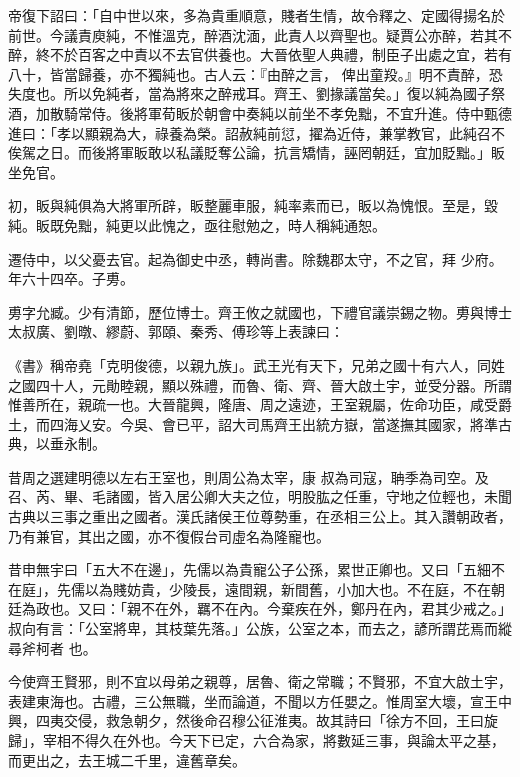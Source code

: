 \begin{pinyinscope}
 帝復下詔曰：「自中世以來，多為貴重順意，賤者生情，故令釋之、定國得揚名於前世。今議責庾純，不惟溫克，醉酒沈湎，此責人以齊聖也。疑賈公亦醉，若其不醉，終不於百客之中責以不去官供養也。大晉依聖人典禮，制臣子出處之宜，若有八十，皆當歸養，亦不獨純也。古人云：『由醉之言，
 俾出童羖。』明不責醉，恐失度也。所以免純者，當為將來之醉戒耳。齊王、劉掾議當矣。」復以純為國子祭酒，加散騎常侍。後將軍荀眅於朝會中奏純以前坐不孝免黜，不宜升進。侍中甄德進曰：「孝以顯親為大，祿養為榮。詔赦純前愆，擢為近侍，兼掌教官，此純召不俟駕之日。而後將軍眅敢以私議貶奪公論，抗言矯情，誣罔朝廷，宜加貶黜。」眅坐免官。



 初，眅與純俱為大將軍所辟，眅整麗車服，純率素而已，眅以為愧恨。至是，毀純。眅既免黜，純更以此愧之，亟往慰勉之，時人稱純通恕。



 遷侍中，以父憂去官。起為御史中丞，轉尚書。除魏郡太守，不之官，拜
 少府。年六十四卒。子旉。



 旉字允臧。少有清節，歷位博士。齊王攸之就國也，下禮官議崇錫之物。旉與博士太叔廣、劉暾、繆蔚、郭頤、秦秀、傅珍等上表諫曰：



 《書》稱帝堯「克明俊德，以親九族」。武王光有天下，兄弟之國十有六人，同姓之國四十人，元勛睦親，顯以殊禮，而魯、衛、齊、晉大啟土宇，並受分器。所謂惟善所在，親疏一也。大晉龍興，隆唐、周之遠迹，王室親屬，佐命功臣，咸受爵土，而四海乂安。今吳、會已平，詔大司馬齊王出統方嶽，當遂撫其國家，將準古典，以垂永制。



 昔周之選建明德以左右王室也，則周公為太宰，康
 叔為司寇，聃季為司空。及召、芮、畢、毛諸國，皆入居公卿大夫之位，明股肱之任重，守地之位輕也，未聞古典以三事之重出之國者。漢氏諸侯王位尊勢重，在丞相三公上。其入讚朝政者，乃有兼官，其出之國，亦不復假台司虛名為隆寵也。



 昔申無宇曰「五大不在邊」，先儒以為貴寵公子公孫，累世正卿也。又曰「五細不在庭」，先儒以為賤妨貴，少陵長，遠間親，新間舊，小加大也。不在庭，不在朝廷為政也。又曰：「親不在外，羈不在內。今棄疾在外，鄭丹在內，君其少戒之。」叔向有言：「公室將卑，其枝葉先落。」公族，公室之本，而去之，諺所謂芘焉而縱尋斧柯者
 也。



 今使齊王賢邪，則不宜以母弟之親尊，居魯、衛之常職；不賢邪，不宜大啟土宇，表建東海也。古禮，三公無職，坐而論道，不聞以方任嬰之。惟周室大壞，宣王中興，四夷交侵，救急朝夕，然後命召穆公征淮夷。故其詩曰「徐方不回，王曰旋歸」，宰相不得久在外也。今天下已定，六合為家，將數延三事，與論太平之基，而更出之，去王城二千里，違舊章矣。




\end{pinyinscope}
